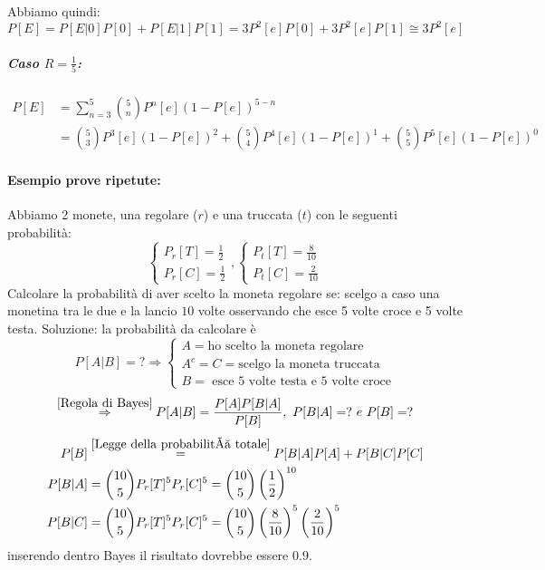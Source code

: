                 Abbiamo quindi:
                \[
                    P[E] =P[E|0]P[0] + P[E|1]P[1] = 3 P^2[e] P[0]+3 P^2[e]P[1] \cong 3 P^2[e]
                \] 
                \subparagraph{Caso $R=\frac{1}{5}$:}
                    \begin{align}
                        P[E] &= \sum_{n=3}^{5}\binom{5}{n}P^n[e](1-P[e])^{5-n} \nonumber \\
                             &= \binom{5}{3}P^3[e](1-P[e])^{2}+\binom{5}{4}P^4[e](1-P[e])^{1}+\binom{5}{5}P^5[e](1-P[e])^{0}\nonumber
                    \end{align}
            \paragraph{Esempio prove ripetute:} Abbiamo 2 monete, una regolare ($r$) e una truccata ($t$) con le seguenti probabilità:
            \[
                \begin{cases}
                    P_r[T] = \frac{1}{2}\nonumber \\
                    P_r[C] = \frac{1}{2}\nonumber
                \end{cases},
                \begin{cases}
                    P_t[T] = \frac{8}{10}\nonumber \\
                    P_t[C] = \frac{2}{10}\nonumber
                \end{cases}
            \]
            Calcolare la probabilità di aver scelto la moneta regolare se: scelgo a caso una monetina tra le due e la lancio $10$ volte
            osservando che esce 5 volte croce e 5 volte testa.
            Soluzione: la probabilità da calcolare è 
            \[
                P[A|B] = ? \Rightarrow \begin{cases}
                    A = \text{ho scelto la moneta regolare}\nonumber \\
                    A^c = C = \text{scelgo la moneta truccata}\nonumber \\
                    B = \text{ esce 5 volte testa e 5 volte croce}\nonumber
                \end{cases}  
            \]
            \[
                \overset{\ref{Regola di Bayes}}{\Rightarrow} P[A|B] = \frac{P[A]P[B|A]}{P[B]},\ P[B|A] = ?\ e\ P[B] = ?\nonumber \\
            \]
            \begin{align}
                P[B] &\overset{\ref{Legge della probabilità totale}}{ = } P[B|A]P[A] + P[B|C]P[C] \nonumber \\
                P[B|A] & = \binom{10}{5} P_r[T]^5P_r[C]^5 = \binom{10}{5} \left(\frac{1}{2}\right)^{10}\nonumber \\
                P[B|C] & = \binom{10}{5} P_r[T]^5P_r[C]^5 = \binom{10}{5} \left(\frac{8}{10}\right)^5\left(\frac{2}{10}\right)^5\nonumber
            \end{align}
            inserendo dentro Bayes il risultato dovrebbe essere $0.9$.
